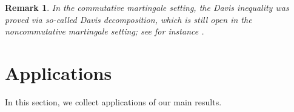 \documentclass[11]{amsart}
\numberwithin{equation}{section}
\newtheorem{remark}[theorem]{Remark}
\newcommand{\M}{\mathcal{M}}
\begin{document}
\begin{remark}
In the commutative martingale setting, the Davis inequality was proved via so-called Davis decomposition, which is still open in the noncommutative martingale setting; see for instance \cite{Pa2007}.  
\end{remark}














\section{Applications}\label{sec-application} 

In this section, we collect applications of our main results. 





%
\end{document}

